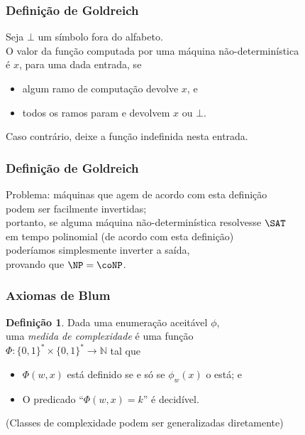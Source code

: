 \documentclass[utf8,notheorems]{beamer}
\theoremstyle{definition}
\newtheorem*{definition}{Definição}
\begin{document}
\begin{frame}
    \frametitle{Definição de Goldreich}
    Seja $\bot$ um símbolo fora do alfabeto. \\
    O valor da função computada por uma máquina não-determinística \\
    é $x$, para uma dada entrada, se
    \begin{itemize}
        \item algum ramo de computação devolve $x$, e
        \item todos os ramos param e devolvem $x$ ou $\bot$.
    \end{itemize}
    Caso contrário, deixe a função indefinida nesta entrada.
    \cite[p.~313]{HopcroftUllman1979}
\end{frame}

\begin{frame}
    \frametitle{Definição de Goldreich}
    Problema: máquinas que agem de acordo com esta definição \\
    podem ser facilmente invertidas;\\
    portanto, se alguma máquina não-determinística resolvesse $\SAT$ \\
    em tempo polinomial (de acordo com esta definição) \\
    poderíamos simplesmente inverter a saída, \\
    provando que $\NP = \coNP$.
\end{frame}

\begin{frame}
    \frametitle{Axiomas de Blum}
    \begin{definition}
        Dada uma enumeração aceitável $\phi$, \\
        uma \emph{medida de complexidade} é uma função \\
        $\Phi: \{0, 1\}^* \times \{0, 1\}^* \to \mathbb N$ tal que~\cite[p.~324]{Blum1967}
        \begin{itemize}
            \item $\Phi(w, x)$ está definido se e só se $\phi_w(x)$ o está; e \\
            \item O predicado ``$\Phi(w, x) = k$'' é decidível.
        \end{itemize}
    \end{definition}
    (Classes de complexidade podem ser generalizadas diretamente)
\end{frame}
\end{document}
